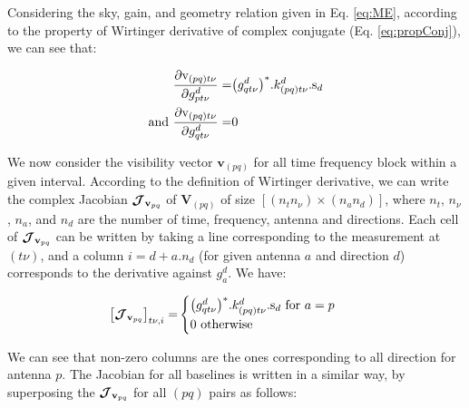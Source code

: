 Considering the sky, gain, and geometry relation given in
Eq. \ref{eq:ME}, according to the property of Wirtinger derivative of complex
conjugate (Eq. \ref{eq:propConj}), we can see that:

\begin{alignat}{2}
\frac{\partial \mathrm{v}_{(pq)t\nu}}{\partial g^{d}_{pt\nu}}=&
{\left(g^{d}_{qt\nu}\right)}^*.k^{d}_{(pq)t\nu}.\mathrm{s}_{d}\\
\text{and}\ \frac{\partial \mathrm{v}_{(pq)t\nu}}{\partial g^{d}_{qt\nu}}=&0\\
\end{alignat}


\def\JVpq{\Jacob\left\{\textbf{v}_{(pq)}\right\}}
\def\JVpq{\Jacob_{\!_{\textbf{v}_{pq}}}}
\def\JVpq{\Jacob_{{\textbf{v}_{pq}}}}
\def\JV{\Jacob\left\{\textbf{v}\right\}}
\def\JV{\Jacob_{\textbf{v}}}

We now consider the visibility vector $\textbf{v}_{(pq)}$ for all time
frequency block within a given interval. According to the definition
of Wirtinger derivative, we can write the complex Jacobian $\JVpq$ of
$\textbf{V}_{(pq)}$ of size $[(n_t n_{\nu})\times (n_a n_d)]$, where
$n_t$, $n_{\nu}$, $n_a$, and $n_d$ are the number of time, frequency,
antenna and directions. Each cell of
$\JVpq$ can be written by taking a line corresponding to the
measurement at $(t\nu)$, and a column $i=d+a.n_d$ (for given antenna $a$ and direction $d$)
corresponds to the derivative against $g^{d}_{a}$. We have:




\begin{alignat}{2}
\label{eq:Jpq}
\left[\JVpq\right]_{t\nu,i}=&
\begin{cases}
\conjp{g^{d}_{qt\nu}}.k^{d}_{(pq)t\nu}.\mathrm{s}_{d}\text{ for }a=p\\
0\ \text{otherwise}
\end{cases}
\end{alignat}

\noindent We can see that non-zero columns are the ones
corresponding to all direction for antenna $p$. The Jacobian for all
baselines is written in a similar way, by superposing the
$\JVpq$ for all $(pq)$ pairs as follows:



